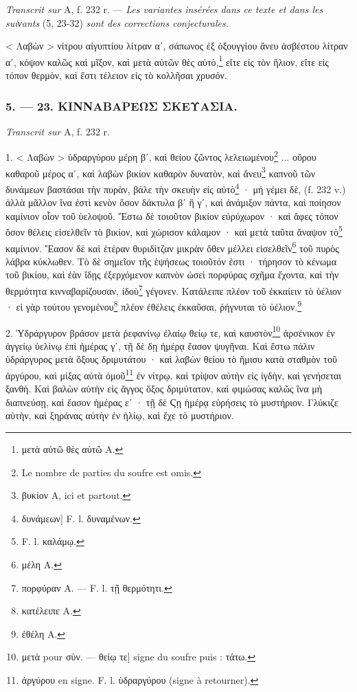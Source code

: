 \documentclass[a4paper, 11pt, oneside, polutonikogreek, french]{article}
\begin{document}
\emph{Transcrit sur} A, f. 232 r. --- \emph{Les variantes insérées dans ce texte et dans les suiνants} (5, 23-32) \emph{sont des corrections conjecturales.}

< Λαβὼν > νίτρου αἰγυπτίου λίτραν αʹ, σάπωνος ἐξ ὀξουγγίου ἄνευ ἀσβέστου λίτραν αʹ, κόψον καλῶς καὶ μῖξον, καὶ μετὰ αὐτῶν θὲς αὐτὸ,\footnote{μετὰ αὐτῶ θὲς αὐτῶ A.} εἴτε εἰς τὸν ἥλιον, εἴτε εἰς τόπον θερμὸν, καὶ ἔστι τέλειον εἰς τὸ κολλῆσαι χρυσόν.

\bigskip
\centerline{\EightStarTaper}
\centerline{\EightStarTaper\EightStarTaper}
\bigskip

\subsubsection{5. --- 23. ΚΙΝΝΑΒΑΡΕΩΣ ΣΚΕΥΑΣΙΑ.}

\emph{Transcrit sur} A, f. 232 r.

1. < Λαβὼν > ὑδραργύρου μέρη βʹ, καὶ θείου ζῶντος λελειωμένου\footnote{Le nombre de parties du soufre est omis.} ... οὔρου καθαροῦ μέρος αʹ, καὶ λαβὼν βικίον καθαρὸν δυνατὸν, καὶ ἄνευ\footnote{βυκίον A, ici et partout.} καπνοῦ τῶν δυνάμεων βαστάσαι τὴν πυρὰν, βάλε τὴν σκευὴν εἰς αὐτὸ\footnote{δυνάμεων] F. l. δυναμένων.} · μή γέμει δὲ, (f. 232 v.) ἀλλὰ μᾶλλον ἵνα ἐστὶ κενὸν ὅσον δάκτυλα βʹ ἢ γʹ, καὶ ἀνάμιξον πάντα, καὶ ποίησον καμίνιον οἷον τοῦ ὑελοψοῦ. Ἔστω δὲ τοιοῦτον βικίον εὐρύχωρον · καὶ ἄφες τόπον ὅσον θέλεις εἰσελθεῖν τὸ βικίον, καὶ χώρισον κάλαμον · καὶ μετὰ ταῦτα ἄναψον τὸ\footnote{F. l. καλάμῳ.} καμίνιον. Ἔασον δὲ καὶ ἑτέραν θυριδίτζαν μικρὰν ὅθεν μέλλει εἰσελθεῖν\footnote{μέλη A.} τοῦ πυρὸς λάβρα κύκλωθεν. Τὸ δὲ σημεῖον τῆς ἑψήσεως τοιοῦτόν ἐστι · τήρησον τὸ κένωμα τοῦ βικίου, καὶ ἐὰν ἴδῃς ἐξερχόμενον καπνὸν ὡσεὶ πορφύρας σχῆμα ἔχοντα, καὶ τὴν θερμότητα κινναβαρίζουσαν, ἰδοὺ\footnote{πορφύραν A. --- F. l. τῇ θερμότητι.} γέγονεν. Κατάλειπε πλέον τοῦ ἐκκαίειν τὸ ὑέλιον · εἰ γὰρ τούτου γενομένου\footnote{κατέλειπε A.} πλέον ἐθέλεις ἐκκαῦσαι, ῥήγνυται τὸ ὑέλιον.\footnote{ἐθέλη A.}

2. Ὑδράργυρον βράσον μετὰ ῥεφανίνῳ ἐλαίῳ θείῳ τε, καὶ καυστὸν\footnote{μετὰ pour σὺν. --- θείῳ τε] signe du soufre puis : τάτω.} ἀρσένικον ἐν ἀγγείῳ ὑελίνῳ ἐπὶ ἡμέρας γʹ, τῇ δὲ δῃ ἡμέρᾳ ἔασον ψυγῆναι. Καὶ ἔστω πάλιν ὑδράργυρος μετὰ ὄξους δριμυτάτου · καὶ λαβὼν θείου τὸ ἥμισυ κατὰ σταθμὸν τοῦ ἀργύρου, καὶ μίξας αὐτὰ ὁμοῦ\footnote{ἀργύρου en signe. F. l. ὑδραργύρου (signe à retourner).} ἐν νίτρῳ, καὶ τρίψον αὐτὴν εἰς ἰγδὴν, καὶ γενήσεται ξανθή. Καὶ βαλὼν αὐτὴν εἰς ἄγγος ὄξος δριμύτατον, καὶ φιμώσας καλῶς ἵνα μὴ διαπνεύσῃ, καὶ ἔασον ἡμέρας εʹ · τῇ δὲ Ϛῃ ἡμέρᾳ εὑρήσεις τὸ μυστήριον. Γλύκιζε αὐτὴν, καὶ ξηράνας αὐτὴν ἐν ἡλίῳ, καὶ ἔχε τὸ μυστήριον.
\end{document}
